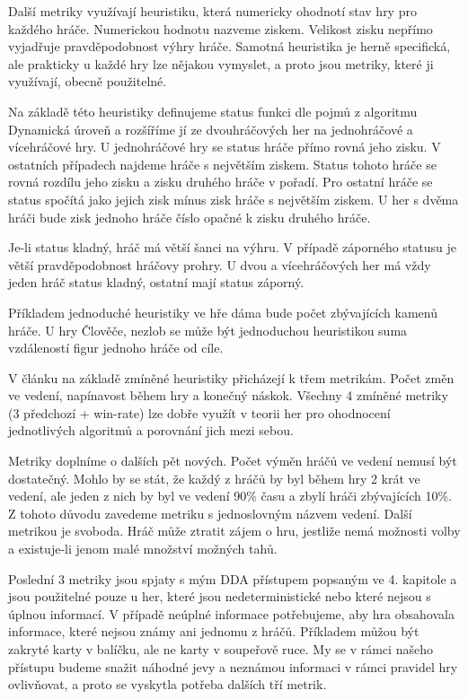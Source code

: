 Další metriky využívají heuristiku, která numericky ohodnotí stav hry pro každého hráče. Numerickou hodnotu nazveme ziskem. Velikost zisku nepřímo vyjadřuje pravděpodobnost výhry hráče. Samotná heuristika je herně specifická, ale prakticky u každé hry lze nějakou vymyslet, a proto jsou metriky, které ji využívají, obecně použitelné. 

Na základě této heuristiky definujeme status funkci dle pojmů z algoritmu Dynamická úroveň a rozšíříme jí ze dvouhráčových her na jednohráčové a vícehráčové hry. U jednohráčové hry se status hráče přímo rovná jeho zisku. V ostatních případech najdeme hráče s největším ziskem. Status tohoto hráče se rovná rozdílu jeho zisku a zisku druhého hráče v pořadí. Pro ostatní hráče se status spočítá jako jejich zisk mínus zisk hráče s největším ziskem. U her s dvěma hráči bude zisk jednoho hráče číslo opačné k zisku druhého hráče.

Je-li status kladný, hráč má větší šanci na výhru. V případě záporného statusu je větší pravděpodobnost hráčovy prohry. U dvou a vícehráčových her má vždy jeden hráč status kladný, ostatní mají status záporný.

Příkladem jednoduché heuristiky ve hře dáma bude počet zbývajících kamenů hráče. U hry Člověče, nezlob se může být jednoduchou heuristikou suma vzdáleností figur jednoho hráče od cíle.
 
V článku \cite{24DynLev} na základě zmíněné heuristiky přicházejí k třem metrikám. Počet změn ve vedení, napínavost během hry a konečný náskok. Všechny 4 zmíněné metriky (3 předchozí + win-rate) lze dobře využít v teorii her pro ohodnocení jednotlivých algoritmů a porovnání jich mezi sebou. 

Metriky doplníme o dalších pět nových. Počet výměn hráčů ve vedení nemusí být dostatečný. Mohlo by se stát, že každý z hráčů by byl během hry 2 krát ve vedení, ale jeden z nich by byl ve vedení 90\% času a zbylí hráči zbývajících 10\%. Z tohoto důvodu zavedeme metriku s jednoslovným názvem vedení. Další metrikou je svoboda. Hráč může ztratit zájem o hru, jestliže nemá možnosti volby a existuje-li jenom malé množství možných tahů.

Poslední 3 metriky jsou spjaty s mým DDA přístupem popsaným ve 4. kapitole a jsou použitelné pouze u her, které jsou nedeterministické nebo které nejsou s úplnou informací. V případě neúplné informace potřebujeme, aby hra obsahovala informace, které nejsou známy ani jednomu z hráčů. Příkladem můžou být zakryté karty v balíčku, ale ne karty v soupeřově ruce. My se v rámci našeho přístupu budeme snažit náhodné jevy a neznámou informaci v rámci pravidel hry ovlivňovat, a proto se vyskytla potřeba dalších tří metrik.

